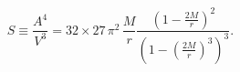 \begin{equation}
S\equiv \frac{A^4}{V^3}=32 \times
27\,\pi^2\,\frac{M}{r}\frac{\left(1-\frac{2M}{r}\right)^{2}}{\left(1-(\frac{2M}{r})^3
\right)^3}.
\end{equation}


